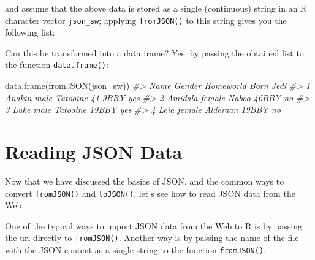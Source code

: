 \documentclass[
]{book}
\newenvironment{Shaded}{\begin{snugshade}}{\end{snugshade}}
\newcommand{\CommentTok}[1]{\textcolor[rgb]{0.56,0.35,0.01}{\textit{#1}}}
\newcommand{\FunctionTok}[1]{\textcolor[rgb]{0.00,0.00,0.00}{#1}}
\newcommand{\NormalTok}[1]{#1}
\begin{document}
and assume that the above data is stored as a single (continuous) string in
an R character vector \texttt{json\_sw}; applying \texttt{fromJSON()} to this string gives
you the following list:

\begin{Shaded}
\end{Shaded}

Can this be transformed into a data frame? Yes, by passing the obtained list
to the function \texttt{data.frame()}:

\begin{Shaded}
\begin{Highlighting}[]
\FunctionTok{data.frame}\NormalTok{(}\FunctionTok{fromJSON}\NormalTok{(json\_sw))}
\CommentTok{\#\textgreater{}      Name Gender Homeworld    Born Jedi}
\CommentTok{\#\textgreater{} 1  Anakin   male  Tatooine 41.9BBY  yes}
\CommentTok{\#\textgreater{} 2 Amidala female     Naboo   46BBY   no}
\CommentTok{\#\textgreater{} 3    Luke   male  Tatooine   19BBY  yes}
\CommentTok{\#\textgreater{} 4    Leia female  Alderaan   19BBY   no}
\end{Highlighting}
\end{Shaded}

\hypertarget{reading-json-data}{%
\section{Reading JSON Data}\label{reading-json-data}}

Now that we have discussed the basics of JSON, and the common ways to convert
\texttt{fromJSON()} and \texttt{toJSON()}, let's see how to read JSON data from the Web.

One of the typical ways to import JSON data from the Web to R is by passing
the url directly to \texttt{fromJSON()}. Another way is by passing the name of the
file with the JSON content as a single string to the function \texttt{fromJSON()}.
\end{document}

